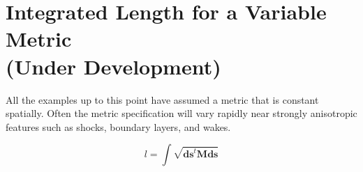 \documentclass{article}
\begin{document}
\section{Integrated Length for a Variable Metric \\ (Under Development)}

All the examples up to this point have assumed a metric that is
constant spatially. Often the metric specification will vary rapidly
near strongly anisotropic features such as shocks, boundary layers,
and wakes.

\begin{equation}
  l = \int \sqrt{\mathbf{ds}^t \mathbf{M} \mathbf{ds}}
\end{equation}
\end{document}
